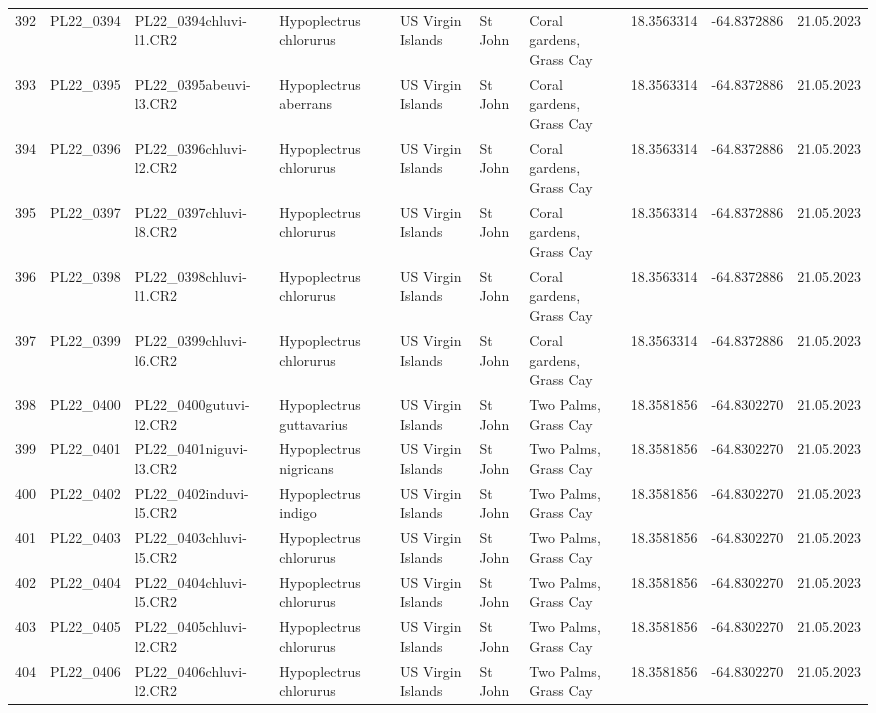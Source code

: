 \begin{table}[ht]
\begin{tabular}{rlllllllll}
  392 & PL22\_0394 & PL22\_0394chluvi-l1.CR2 & Hypoplectrus chlorurus & US Virgin Islands & St John & Coral gardens, Grass Cay & 18.3563314 & -64.8372886 & 21.05.2023 \\ 
  393 & PL22\_0395 & PL22\_0395abeuvi-l3.CR2 & Hypoplectrus aberrans & US Virgin Islands & St John & Coral gardens, Grass Cay & 18.3563314 & -64.8372886 & 21.05.2023 \\ 
  394 & PL22\_0396 & PL22\_0396chluvi-l2.CR2 & Hypoplectrus chlorurus & US Virgin Islands & St John & Coral gardens, Grass Cay & 18.3563314 & -64.8372886 & 21.05.2023 \\ 
  395 & PL22\_0397 & PL22\_0397chluvi-l8.CR2 & Hypoplectrus chlorurus & US Virgin Islands & St John & Coral gardens, Grass Cay & 18.3563314 & -64.8372886 & 21.05.2023 \\ 
  396 & PL22\_0398 & PL22\_0398chluvi-l1.CR2 & Hypoplectrus chlorurus & US Virgin Islands & St John & Coral gardens, Grass Cay & 18.3563314 & -64.8372886 & 21.05.2023 \\ 
  397 & PL22\_0399 & PL22\_0399chluvi-l6.CR2 & Hypoplectrus chlorurus & US Virgin Islands & St John & Coral gardens, Grass Cay & 18.3563314 & -64.8372886 & 21.05.2023 \\ 
  398 & PL22\_0400 & PL22\_0400gutuvi-l2.CR2 & Hypoplectrus guttavarius & US Virgin Islands & St John & Two Palms, Grass Cay & 18.3581856 & -64.8302270 & 21.05.2023 \\ 
  399 & PL22\_0401 & PL22\_0401niguvi-l3.CR2 & Hypoplectrus nigricans & US Virgin Islands & St John & Two Palms, Grass Cay & 18.3581856 & -64.8302270 & 21.05.2023 \\ 
  400 & PL22\_0402 & PL22\_0402induvi-l5.CR2 & Hypoplectrus indigo & US Virgin Islands & St John & Two Palms, Grass Cay & 18.3581856 & -64.8302270 & 21.05.2023 \\ 
  401 & PL22\_0403 & PL22\_0403chluvi-l5.CR2 & Hypoplectrus chlorurus & US Virgin Islands & St John & Two Palms, Grass Cay & 18.3581856 & -64.8302270 & 21.05.2023 \\ 
  402 & PL22\_0404 & PL22\_0404chluvi-l5.CR2 & Hypoplectrus chlorurus & US Virgin Islands & St John & Two Palms, Grass Cay & 18.3581856 & -64.8302270 & 21.05.2023 \\ 
  403 & PL22\_0405 & PL22\_0405chluvi-l2.CR2 & Hypoplectrus chlorurus & US Virgin Islands & St John & Two Palms, Grass Cay & 18.3581856 & -64.8302270 & 21.05.2023 \\ 
  404 & PL22\_0406 & PL22\_0406chluvi-l2.CR2 & Hypoplectrus chlorurus & US Virgin Islands & St John & Two Palms, Grass Cay & 18.3581856 & -64.8302270 & 21.05.2023 \\ 

\end{tabular}
\end{table}
